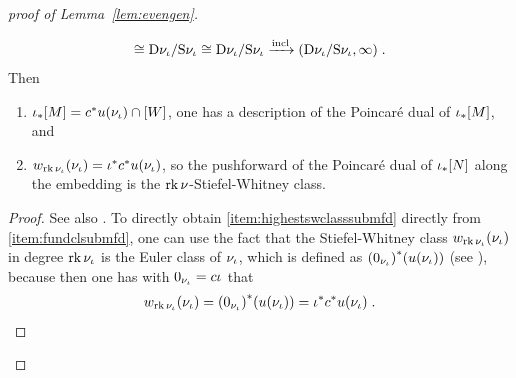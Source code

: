 \begin{proof}[proof of
  Lemma~\ref{lem:evengen}]
\begin{Lem}
\begin{gather*}
      \cong \mathrm{D}\nu_{{\iota}} / \mathrm{S}\nu_{{\iota}}
      \cong \mathrm{D}\nu_{{\iota}}/\mathrm{S}\nu_{{\iota}}
      \xrightarrow{\mathrm{incl}} (\mathrm{D}\nu_{{\iota}}/\mathrm{S}\nu_{{\iota}},\infty)
      \;.
    \end{gather*}
    Then
    \begin{enumerate}
    \item\label{item:fundclsubmfd}
      ${{\iota}}_*[M] = {c}^*{u}(\nu_{{\iota}})\cap[W]$,
      \idest one has a description of the Poincaré dual of
      ${{\iota}}_*[M]$, and
    \item\label{item:highestswclasssubmfd}
      ${w_{\operatorname{rk}\nu_{{\iota}}}}(\nu_{{\iota}})
      = {{\iota}}^*{c}^*{u}(\nu_{{\iota}})$, 
      so the pushforward of the Poincaré dual of ${{\iota}}_*[N]$
      along the embedding is the $\operatorname{rk}\nu_{}$-Stiefel-Whitney class.
    \end{enumerate}
    \begin{proof}
      See also \cite[p.~371]{bredon}.
      To directly obtain \ref{item:highestswclasssubmfd} directly from
      \ref{item:fundclsubmfd}, one can use the fact that
      the Stiefel-Whitney class ${w_{\operatorname{rk}\nu_{{\iota}}}}(\nu_{{\iota}})$ in degree
      $\operatorname{rk}{\nu_{{\iota}}}$ is the Euler class of $\nu_{{\iota}}$, which is
      defined as ${(0_{\nu_{{\iota}}})}^*({u}(\nu_{{\iota}}))$
      (see \forexample \cite[Prop.~17.2]{bredon}), because then
      one has with $0_{\nu_{{\iota}}} = c{\iota}$ that
      \begin{gather*}
        {w_{\operatorname{rk}\nu_{{\iota}}}}(\nu_{{\iota}})
        = {(0_{\nu_{{\iota}}})}^*({u}(\nu_{{\iota}}))
        = {{\iota}}^*{c}^*{u}(\nu_{{\iota}})
        \;.
      \end{gather*}
      

\end{proof}
\end{Lem}
\end{proof}
